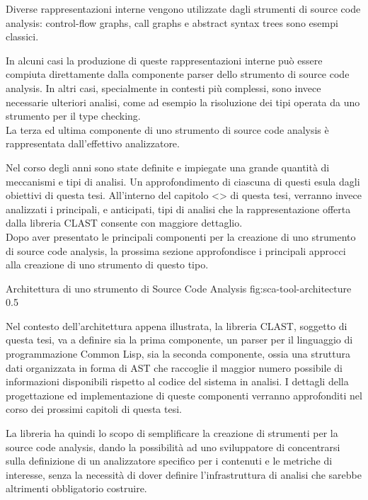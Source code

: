 Diverse  rappresentazioni interne vengono utilizzate dagli strumenti di source
code analysis: control-flow graphs, call graphs e abstract syntax trees sono
esempi classici.

In alcuni casi la produzione di queste rappresentazioni interne può essere
compiuta direttamente dalla componente parser dello strumento di source code
analysis. In altri casi, specialmente in contesti più complessi, sono invece
necessarie ulteriori analisi, come ad esempio la risoluzione dei tipi operata
da uno strumento per il type checking.\\

La terza ed ultima componente di uno strumento di source code analysis è
rappresentata dall’effettivo analizzatore.

Nel corso degli anni sono state definite e impiegate una grande quantità di
meccanismi e tipi di analisi. Un approfondimento di ciascuna di questi esula
dagli obiettivi di questa tesi. All’interno del capitolo <> di questa tesi,
verranno invece analizzati i principali, e anticipati, tipi di analisi che la
rappresentazione offerta dalla libreria CLAST consente con maggiore
dettaglio.\\

Dopo aver presentato le principali componenti per la creazione di uno strumento
di source code analysis, la prossima sezione approfondisce i principali approcci
alla creazione di uno strumento di questo tipo.

      {Architettura di uno strumento di Source Code Analysis}
      {fig:sca-tool-architecture}
      {0.5}
      
Nel contesto dell'architettura appena illustrata, la libreria CLAST, soggetto di 
questa tesi, va a definire sia la prima componente, un parser per il linguaggio
di programmazione Common Lisp, sia la seconda componente, ossia una struttura
dati organizzata in forma di AST che raccoglie il maggior numero possibile di
informazioni disponibili rispetto al codice del sistema in analisi. I dettagli
della progettazione ed implementazione di queste componenti verranno approfonditi
nel corso dei prossimi capitoli di questa tesi.

La libreria ha quindi lo scopo di semplificare la creazione di strumenti per la
source code analysis, dando la possibilità ad uno sviluppatore di concentrarsi
sulla definizione di un analizzatore specifico per i contenuti e le metriche di
interesse, senza la necessità di dover definire l'infrastruttura di analisi che
sarebbe altrimenti obbligatorio costruire.

